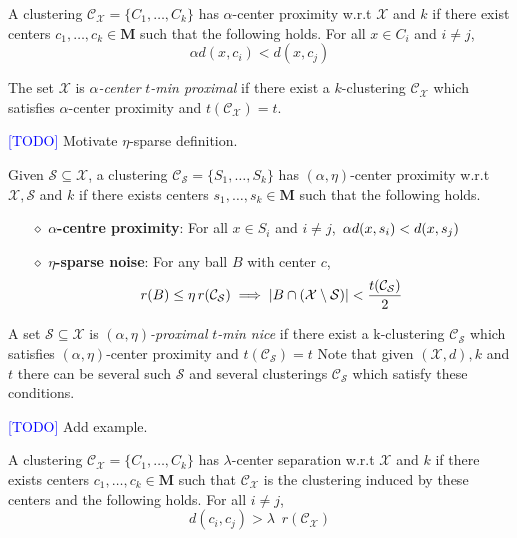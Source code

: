 \documentclass[anon,12pt]{colt2016} %
\newcommand{\mc}{\mathcal}
\newcommand{\mb}{\mathbf}
\newcommand{\todo}{\textcolor{blue}{[TODO]}\xspace}
\begin{document}
\begin{definition}
\label{defn:alphacp}
A clustering $\mc C_{\mc X} = \{C_1, \ldots, C_k\}$ has $\alpha$-center proximity w.r.t $\mc X$ and $k$ if there exist centers $c_1, \ldots, c_k \in \mb M$  such that the following holds. For all $x \in C_i$ and $i\neq j$, 
$$\alpha d(x, c_i) < d(x, c_j)$$
\end{definition}

\noindent The set $\mc X$ is {\it $\alpha$-center} {\it $t$-min proximal} if there exist a $k$-clustering $\mc C_{\mc X}$  which satisfies $\alpha$-center proximity and $t(\mc C_{\mc X}) = t$. 

\todo Motivate $\eta$-sparse definition.

\begin{definition}[$(\alpha, \eta)$-center proximity]
Given $\mc S \subseteq \mc X$, a clustering $\mc C_{\mc S} = \{S_1, \ldots, S_k\}$ has $(\alpha, \eta)$-center proximity w.r.t $\mc X, \mc S$ and $k$ if there exists centers $s_1, \ldots, s_k \in \mb M$  such that the following holds.
\begin{itemize}[nolistsep, noitemsep]
\label{defn:alphacpnoise}	

\item[$\diamond$] {\bf $\alpha$-centre proximity}: For all $x \in S_i$ and $i\neq j$, $\thinspace\alpha d(x, s_i) < d(x, s_j)$
\item[$\diamond$]{\bf $\eta$-sparse noise}: For any ball $B$ with center $c$, 
\vspace{-0.1in}\begin{align*}
r(B)\leq \eta \thinspace r(\mc{C}_{\mc S}) \implies |B\cap (\mc X\setminus \mc S)| < \frac{t(\mc C_{\mc S})}{2}
\end{align*}
\end{itemize}
\end{definition}

\noindent A set $\mc S \subseteq \mc X$ is {\it $(\alpha, \eta)$-proximal} {\it $t$-min nice} if there exist a k-clustering $\mc C_{\mc S}$ which satisfies $(\alpha, \eta)$-center proximity and $t(\mc{C}_{\mc{S}}) = t$ %
Note that given $(\mc X, d), k$ and $t$ there can be several such $\mc S$ and several clusterings $\mc C_{\mc S}$ which satisfy these conditions.

\todo Add example.

\begin{definition}
\label{defn:lambdacs}
A clustering $\mc C_{\mc X} = \{C_1, \ldots, C_k\}$ has $\lambda$-center separation w.r.t $\mc X$ and $k$ if there exists centers $c_1, \ldots, c_k \in \mb M$ such that $\mc C_{\mc X}$ is the clustering induced by these centers and the following holds. For all $i\neq j$, 
$$d(c_i, c_j) > \lambda \enspace r(\mc{C}_{\mc{X}})$$
\end{definition}
\end{document}

